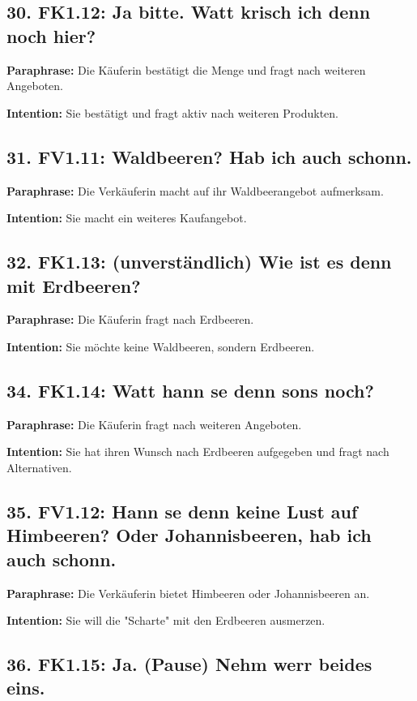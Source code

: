 \documentclass[11pt]{article}
\begin{document}
\subsection*{30. FK1.12: Ja bitte. Watt krisch ich denn noch hier?}

\textbf{Paraphrase:} Die Käuferin bestätigt die Menge und fragt nach weiteren Angeboten.

\textbf{Intention:} Sie bestätigt und fragt aktiv nach weiteren Produkten.

\subsection*{31. FV1.11: Waldbeeren? Hab ich auch schonn.}

\textbf{Paraphrase:} Die Verkäuferin macht auf ihr Waldbeerangebot aufmerksam.

\textbf{Intention:} Sie macht ein weiteres Kaufangebot.

\subsection*{32. FK1.13: (unverständlich) Wie ist es denn mit Erdbeeren?}

\textbf{Paraphrase:} Die Käuferin fragt nach Erdbeeren.

\textbf{Intention:} Sie möchte keine Waldbeeren, sondern Erdbeeren.

\subsection*{34. FK1.14: Watt hann se denn sons noch?}

\textbf{Paraphrase:} Die Käuferin fragt nach weiteren Angeboten.

\textbf{Intention:} Sie hat ihren Wunsch nach Erdbeeren aufgegeben und fragt nach Alternativen.

\subsection*{35. FV1.12: Hann se denn keine Lust auf Himbeeren? Oder Johannisbeeren, hab ich auch schonn.}

\textbf{Paraphrase:} Die Verkäuferin bietet Himbeeren oder Johannisbeeren an.

\textbf{Intention:} Sie will die "Scharte" mit den Erdbeeren ausmerzen.

\subsection*{36. FK1.15: Ja. (Pause) Nehm werr beides eins.}
\end{document}
